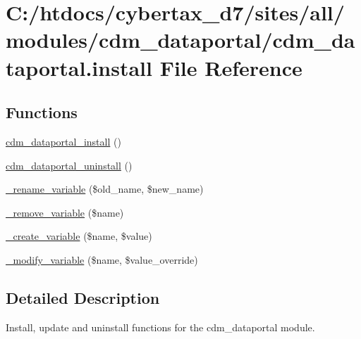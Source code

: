 \hypertarget{cdm__dataportal_8install}{\section{C\-:/htdocs/cybertax\-\_\-d7/sites/all/modules/cdm\-\_\-dataportal/cdm\-\_\-dataportal.install File Reference}
\label{cdm__dataportal_8install}
}
\subsection*{Functions}
\begin{DoxyCompactItemize}
\item 
\hyperlink{cdm__dataportal_8install_af9150bd37def265412edcc89aa57e625}{cdm\-\_\-dataportal\-\_\-install} ()
\item 
\hyperlink{cdm__dataportal_8install_a703060a6d971387ebb635294337f6280}{cdm\-\_\-dataportal\-\_\-uninstall} ()
\item 
\hyperlink{cdm__dataportal_8install_a1d36393283fadcbbdc7d7837efcfa43c}{\-\_\-rename\-\_\-variable} (\$old\-\_\-name, \$new\-\_\-name)
\item 
\hyperlink{cdm__dataportal_8install_a22173427ed5108fdfb0e9858f9553cef}{\-\_\-remove\-\_\-variable} (\$name)
\item 
\hyperlink{cdm__dataportal_8install_a3f9a34685ea3fe1de52b2b556167b7cc}{\-\_\-create\-\_\-variable} (\$name, \$value)
\item 
\hyperlink{cdm__dataportal_8install_a5b56096b8a84ac6ee2eaa0f5407ba139}{\-\_\-modify\-\_\-variable} (\$name, \$value\-\_\-override)
\end{DoxyCompactItemize}


\subsection{Detailed Description}
Install, update and uninstall functions for the cdm\-\_\-dataportal module. 

